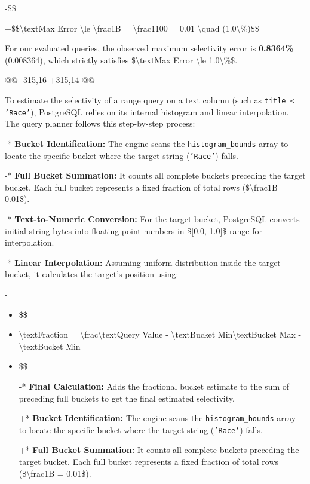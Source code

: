 \documentclass[11pt,a4paper]{article}
\begin{document}
{-\$\$

+\$\$\textbackslash{}text{Max Error} \textbackslash{}le \textbackslash{}frac{1}{B} = \textbackslash{}frac{1}{100} = 0.01 \textbackslash{}quad (1.0\textbackslash{}\%)\$\$


For our evaluated queries, the observed maximum selectivity error is \textbf{0.8364\%} (0.008364), which strictly satisfies \$\textbackslash{}text{Max Error} \textbackslash{}le 1.0\textbackslash{}\%\$.


@@ -315,16 +315,14 @@


To estimate the selectivity of a range query on a text column (such as \texttt{title < 'Race'}), PostgreSQL relies on its internal histogram and linear interpolation. The query planner follows this step-by-step process:


-*   \textbf{Bucket Identification:} The engine scans the \texttt{histogram\_bounds} array to locate the specific bucket where the target string (\texttt{'Race'}) falls.

-*   \textbf{Full Bucket Summation:} It counts all complete buckets preceding the target bucket. Each full bucket represents a fixed fraction of total rows (\$\textbackslash{}frac{1}{B} = 0.01\$).

-*   \textbf{Text-to-Numeric Conversion:} For the target bucket, PostgreSQL converts initial string bytes into floating-point numbers in \$[0.0, 1.0]\$ range for interpolation.

-*   \textbf{Linear Interpolation:} Assuming uniform distribution inside the target bucket, it calculates the target's position using:

-

\begin{itemize}
\item    \$\$
\item    \textbackslash{}text{Fraction} = \textbackslash{}frac{\textbackslash{}text{Query Value} - \textbackslash{}text{Bucket Min}}{\textbackslash{}text{Bucket Max} - \textbackslash{}text{Bucket Min}}
\item    \$\$
-

-*   \textbf{Final Calculation:} Adds the fractional bucket estimate to the sum of preceding full buckets to get the final estimated selectivity.

+* \textbf{Bucket Identification:} The engine scans the \texttt{histogram\_bounds} array to locate the specific bucket where the target string (\texttt{'Race'}) falls.

+* \textbf{Full Bucket Summation:} It counts all complete buckets preceding the target bucket. Each full bucket represents a fixed fraction of total rows (\$\textbackslash{}frac{1}{B} = 0.01\$).


\end{itemize}}
\end{document}
